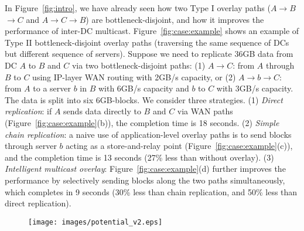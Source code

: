 In Figure~\ref{fig:intro}, we have already seen how two Type I overlay
paths ($A$$\rightarrow$$B$$\rightarrow$$C$ and
$A$$\rightarrow$$C$$\rightarrow$$B$) are bottleneck-disjoint,
and how it improves the performance of inter-DC multicast.
Figure~\ref{fig:case:example} shows an example
of Type II bottleneck-disjoint overlay paths
(traversing the same sequence of DCs but different sequence of
servers). Suppose we need to replicate 36GB data from DC $A$
to $B$ and $C$ via two bottleneck-disjoint paths:
(1) $A$$\rightarrow$$C$:
from $A$ through $B$ to $C$ using IP-layer WAN routing with
2GB/s capacity, or
(2) $A$$\rightarrow$$b$$\rightarrow$$C$: from $A$ to a server
$b$ in $B$ with
6GB/s capacity and $b$ to $C$ with 3GB/s capacity.
The data is split into six 6GB-blocks.
We consider three strategies.
(1) {\em Direct replication}:
if $A$ sends data directly to $B$ and $C$ via WAN paths
(Figure~\ref{fig:case:example}(b)),
the completion time is 18 seconds.
(2) {\em Simple chain replication}:
a naive use of application-level overlay paths
is to send blocks through server $b$ acting as a
store-and-relay point
(Figure~\ref{fig:case:example}(c)),
and the completion time is 13 seconds (27\% less than without overlay).
(3) {\em Intelligent multicast overlay}:
Figure~\ref{fig:case:example}(d) further improves the performance by
selectively sending blocks along the two paths simultaneously,
which completes in 9 seconds (30\% less than chain replication,
and 50\% less than direct replication).



\begin{figure}[t]
\centering
\texttt{[image: images/potential\_v2.eps]}%
\label{fig:case:size}
\vspace{-0.4cm}
\end{figure}

